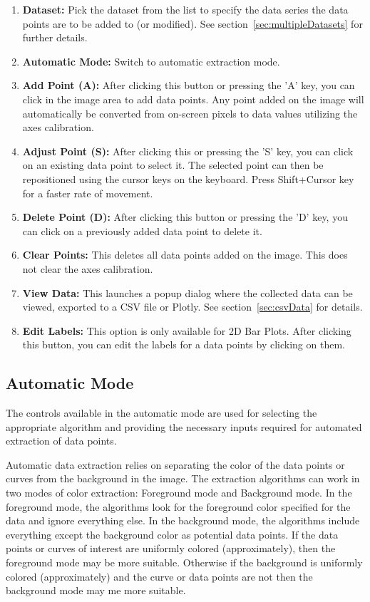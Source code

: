 \documentclass[letterpaper, 11pt]{article}
\begin{document}
\begin{enumerate}
\item{{\bf Dataset: }Pick the dataset from the list to specify the data series the data points are to be added to (or modified). See section~\ref{sec:multipleDatasets} for further details.}
\item{{\bf Automatic Mode: }Switch to automatic extraction mode.}
\item{{\bf Add Point (A): }After clicking this button or pressing the 'A' key, you can click in the image area to add data points. Any point added on the image will automatically be converted from on-screen pixels to data values utilizing the axes calibration.}
\item{{\bf Adjust Point (S): }After clicking this or pressing the 'S' key, you can click on an existing data point to select it. The selected point can then be repositioned using the cursor keys on the keyboard. Press Shift+Cursor key for a faster rate of movement.}
\item{{\bf Delete Point (D): }After clicking this button or pressing the 'D' key, you can click on a previously added data point to delete it.}
\item{{\bf Clear Points: }This deletes all data points added on the image. This does not clear the axes calibration.}
\item{{\bf View Data: }This launches a popup dialog where the collected data can be viewed, exported to a CSV file or Plotly. See section~\ref{sec:csvData} for details.}
\item{{\bf Edit Labels: }This option is only available for 2D Bar Plots. After clicking this button, you can edit the labels for a data points by clicking on them.}
\end{enumerate}

\subsection{Automatic Mode}
The controls available in the automatic mode are used for selecting the appropriate algorithm and providing the necessary inputs required for automated extraction of data points. 

Automatic data extraction relies on separating the color of the data points or curves from the background in the image. The extraction algorithms can work in two modes of color extraction: Foreground mode and Background mode. In the foreground mode, the algorithms look for the foreground color specified for the data and ignore everything else. In the background mode, the algorithms include everything except the background color as potential data points. If the data points or curves of interest are uniformly colored (approximately), then the foreground mode may be more suitable. Otherwise if the background is uniformly colored (approximately) and the curve or data points are not then the background mode may me more suitable.
\end{document}
